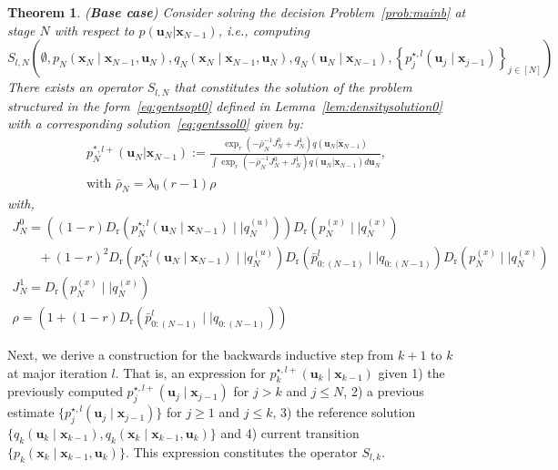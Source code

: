 \documentclass[a4paper,fleqn]{cas-sc}
\newcommand{\bv}[1]{\mathbf{#1}}
\newcommand{\Dr}[2]{{D}_{\text{r}}\left(#1\mid \mid #2 \right)}
\newcommand{\plant}[2]{p_{{#1}} \left(\bv{x}_{{#1}}\mid \bv{x}_{{#2}}, \bv{u}_{{#1}} \right)}
\newcommand{\optimalpolicygen}[3]{p^{\star,{#3}}_{{#1}} \left(\bv{u}_{{#1}}\mid \bv{x}_{{#2}} \right)}
\newcommand{\refplant}[2]{q_{{#1}} \left(\bv{x}_{{#1}}\mid \bv{x}_{{#2}}, \bv{u}_{{#1}} \right)}
\newcommand{\refpolicy}[2]{q_{{#1}}\left(\bv{u}_{{#1}}\mid \bv{x}_{{#2}} \right)}
\newtheorem{theorem}{Theorem}[section]
\begin{document}
\begin{theorem}\label{th:solnonefpN}
(\textbf{Base case}) Consider solving the decision Problem~\ref{prob:mainb} at stage $N$ with respect to $p(\bv{u}_N\vert\bv{x}_{N-1})$, i.e., computing 
\[
S_{l,N}\left(\emptyset,\plant{N}{N-1},\refplant{N}{N-1},\refpolicy{N}{N-1},\left\{\optimalpolicygen{j}{j-1}{l}\right\}_{j\in[N]}\right)
\]
There exists an operator $S_{l,N}$ that constitutes the solution of the problem structured in the form~\eqref{eq:gentsopt0} defined in Lemma~\ref{lem:densitysolution0} with a corresponding solution~\eqref{eq:gentssol0} given by:
    \begin{equation}\label{eq:backfpsolNthm}
    \begin{array}{l}
        p^{*,l+}_N(\bv{u}_N\vert\bv{x}_{N-1}):= \frac{\exp_r\left(-\bar{\rho}_N^{-1}J_N^0+J^1_N \right)q(\bv{u}_N\vert \bv{x}_{N-1})}{\int \exp_r\left(-\bar{\rho}_N^{-1}J_N^0+J_N^1 \right)q(\bv{u}_N\vert \bv{x}_{N-1}) d\bv{u}_N},\\
        \text{with } \bar{\rho}_N = \lambda_0(r-1)\rho
        \end{array}
    \end{equation}
    with,
\begin{equation}\label{eq:backfpsolNtermsthm}
\begin{array}{l}
J^0_N=\left((1-r)\Dr{\optimalpolicygen{N}{N-1}{l}}{q^{(u)}_N}\right)\Dr{p^{(x)}_N}{q^{(x)}_N}
\\ \qquad +(1-r)^2 \Dr{\optimalpolicygen{N}{N-1}{l}}{q^{(u)}_N}\Dr{\bar{p}^{l}_{0:(N-1)}}{q_{0:(N-1)}}\Dr{p^{(x)}_N}{q^{(x)}_N} 
\\ J^1_N= \Dr{p^{(x)}_N}{q^{(x)}_N}
 \\ 
\rho = \left(1+ (1-r)\Dr{\bar{p}^{l}_{0:(N-1)}}{q_{0:(N-1)}}\right)
\end{array}
\end{equation}
\end{theorem}

Next, we derive a construction for the backwards inductive step from $k+1$ to $k$ at major iteration $l$. That is, an expression for $\optimalpolicygen{k}{k-1}{l+}$ given 1) the previously computed $\optimalpolicygen{j}{j-1}{l+}$ for $j>k$ and $j\le N$, 2) a previous estimate $\{\optimalpolicygen{j}{j-1}{l}\}$ for $j\ge 1$ and $j\le k$, 3) the reference solution $\{\refpolicy{k}{k-1},\refplant{k}{k-1}\}$ and 4) current transition $\{\plant{k}{k-1}\}$. This expression constitutes the operator $S_{l,k}$.
\end{document}
